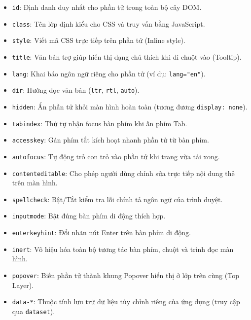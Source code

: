 \documentclass[11pt,oneside]{book}
\newcommand{\codeinline}[1]{\textcolor{accentOrange}{\texttt{#1}}}
\begin{document}
\begin{itemize}
    \item \codeinline{id}: Định danh duy nhất cho phần tử trong toàn bộ cây DOM.
    \item \codeinline{class}: Tên lớp định kiểu cho CSS và truy vấn bằng JavaScript.
    \item \codeinline{style}: Viết mã CSS trực tiếp trên phần tử (Inline style).
    \item \codeinline{title}: Văn bản trợ giúp hiển thị dạng chú thích khi di chuột vào (Tooltip).
    \item \codeinline{lang}: Khai báo ngôn ngữ riêng cho phần tử (ví dụ: \codeinline{lang="en"}).
    \item \codeinline{dir}: Hướng đọc văn bản (\codeinline{ltr}, \codeinline{rtl}, \codeinline{auto}).
    \item \codeinline{hidden}: Ẩn phần tử khỏi màn hình hoàn toàn (tương đương \codeinline{display: none}).
    \item \codeinline{tabindex}: Thứ tự nhận focus bàn phím khi ấn phím Tab.
    \item \codeinline{accesskey}: Gán phím tắt kích hoạt nhanh phần tử từ bàn phím.
    \item \codeinline{autofocus}: Tự động trỏ con trỏ vào phần tử khi trang vừa tải xong.
    \item \codeinline{contenteditable}: Cho phép người dùng chỉnh sửa trực tiếp nội dung thẻ trên màn hình.
    \item \codeinline{spellcheck}: Bật/Tắt kiểm tra lỗi chính tả ngôn ngữ của trình duyệt.
    \item \codeinline{inputmode}: Bật đúng bàn phím di động thích hợp.
    \item \codeinline{enterkeyhint}: Đổi nhãn nút Enter trên bàn phím di động.
    \item \codeinline{inert}: Vô hiệu hóa toàn bộ tương tác bàn phím, chuột và trình đọc màn hình.
    \item \codeinline{popover}: Biến phần tử thành khung Popover hiển thị ở lớp trên cùng (Top Layer).
    \item \codeinline{data-*}: Thuộc tính lưu trữ dữ liệu tùy chỉnh riêng của ứng dụng (truy cập qua \codeinline{dataset}).
\end{itemize}
\end{document}
